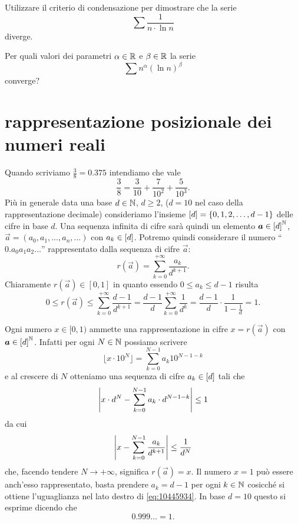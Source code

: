\begin{exercise}
Utilizzare il criterio di condensazione per dimostrare che la serie
\[
  \sum \frac{1}{n \cdot \ln n}
\]
diverge.
\end{exercise}

\begin{exercise}
  Per quali valori dei parametri $\alpha\in {\mathbb R}$ e $\beta\in {\mathbb R}$
  la serie
  \[
    \sum n^\alpha (\ln n)^\beta
  \]
  converge?
\end{exercise}

\section{rappresentazione posizionale dei numeri reali}
Quando scriviamo $\frac{3}{8} = 0.375$ intendiamo che vale 
\[
\frac 3 8 = \frac{3}{10} + \frac{7}{10^2} + \frac{5}{10^3}.  
\]
Più in generale data una base $d\in {\mathbb N}$, $d\ge 2$, ($d=10$ nel 
caso della rappresentazione decimale)
consideriamo l'insieme ${\left[ d \right]} = {\left\{ 0,1,2,\dots, d-1 \right\}}$ 
delle cifre in base $d$.
Una sequenza infinita di cifre sarà quindi un elemento 
$\boldsymbol a \in {\left[ d \right]}^{\mathbb N}$, $\vec a = (a_0,a_1,\dots, a_n, \dots)$
con $a_k\in {\left[ d \right]}$.
Potremo quindi considerare il numero ``$0.a_0 a_1 a_2 \ldots$'' rappresentato 
dalla sequenza di cifre $\vec a$:
\[
  r(\vec a) = \sum_{k=0}^{+\infty} \frac{a_k}{d^{k+1}}.
\]
Chiaramente $r(\vec a)\in [0,1]$ in quanto essendo $0\le a_k\le d-1$ 
risulta
\begin{equation}\label{eq:10445934}
 0 \le r(\vec a) \le \sum_{k=0}^{+\infty} \frac{d-1}{d^{k+1}}
  = \frac{d-1}{d}\sum_{k=0}^{+\infty}\frac 1 {d^k}
  = \frac{d-1}{d}\cdot \frac{1}{1-\frac 1 d} = 1.
\end{equation}

Ogni numero $x\in [0,1)$ ammette una rappresentazione in cifre $x=r(\vec a)$ 
con $\boldsymbol a \in {\left[ d \right]}^{\mathbb N}$. 
Infatti per ogni $N\in {\mathbb N}$ possiamo scrivere 
\[
  \lfloor x\cdot 10^N \rfloor= \sum_{k=0}^{N-1} a_k 10^{N-1-k}
\]
e al crescere di $N$ otteniamo una sequenza di cifre $a_k\in {\left[ d \right]}$ 
tali che 
\[
  {\left|x \cdot d^N - \sum_{k=0}^{N-1} a_k \cdot d^{N-1-k}\right|} \le 1
\]
da cui 
\[
  {\left|x - \sum_{k=0}^{N-1} \frac{a_k}{d^{k+1}}\right|} \le \frac{1}{d^{N}}
\]
che, facendo tendere $N\to +\infty$, significa $r(\vec a) = x$.
Il numero $x=1$ può essere anch'esso rappresentato, basta prendere 
$a_k=d-1$ per ogni $k\in {\mathbb N}$ cosicché si ottiene l'uguaglianza 
nel lato destro di \eqref{eq:10445934}. 
In base $d=10$ questo si esprime dicendo che 
\[
 0.999\ldots = 1.  
\]

